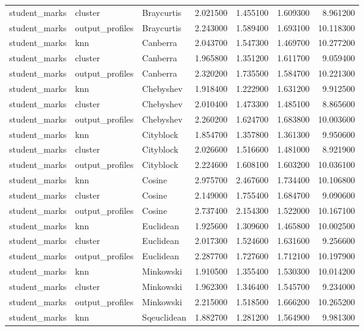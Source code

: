 \begin{tabular}{lllrrrr}
student\_marks & cluster & Braycurtis & 2.021500 & 1.455100 & 1.609300 & 8.961200 \\
student\_marks & output\_profiles & Braycurtis & 2.243000 & 1.589400 & 1.693100 & 10.118300 \\
student\_marks & knn & Canberra & 2.043700 & 1.547300 & 1.469700 & 10.277200 \\
student\_marks & cluster & Canberra & 1.965800 & 1.351200 & 1.611700 & 9.059400 \\
student\_marks & output\_profiles & Canberra & 2.320200 & 1.735500 & 1.584700 & 10.221300 \\
student\_marks & knn & Chebyshev & 1.918400 & 1.222900 & 1.631200 & 9.912500 \\
student\_marks & cluster & Chebyshev & 2.010400 & 1.473300 & 1.485100 & 8.865600 \\
student\_marks & output\_profiles & Chebyshev & 2.260200 & 1.624700 & 1.683800 & 10.003600 \\
student\_marks & knn & Cityblock & 1.854700 & 1.357800 & 1.361300 & 9.950600 \\
student\_marks & cluster & Cityblock & 2.026600 & 1.516600 & 1.481000 & 8.921900 \\
student\_marks & output\_profiles & Cityblock & 2.224600 & 1.608100 & 1.603200 & 10.036100 \\
student\_marks & knn & Cosine & 2.975700 & 2.467600 & 1.734400 & 10.106800 \\
student\_marks & cluster & Cosine & 2.149000 & 1.755400 & 1.684700 & 9.090600 \\
student\_marks & output\_profiles & Cosine & 2.737400 & 2.154300 & 1.522000 & 10.167100 \\
student\_marks & knn & Euclidean & 1.925600 & 1.309600 & 1.465800 & 10.002500 \\
student\_marks & cluster & Euclidean & 2.017300 & 1.524600 & 1.631600 & 9.256600 \\
student\_marks & output\_profiles & Euclidean & 2.287700 & 1.727600 & 1.712100 & 10.197900 \\
student\_marks & knn & Minkowski & 1.910500 & 1.355400 & 1.530300 & 10.014200 \\
student\_marks & cluster & Minkowski & 1.962300 & 1.346400 & 1.545700 & 9.234000 \\
student\_marks & output\_profiles & Minkowski & 2.215000 & 1.518500 & 1.666200 & 10.265200 \\
student\_marks & knn & Sqeuclidean & 1.882700 & 1.281200 & 1.564900 & 9.981300 \\

\end{tabular}
